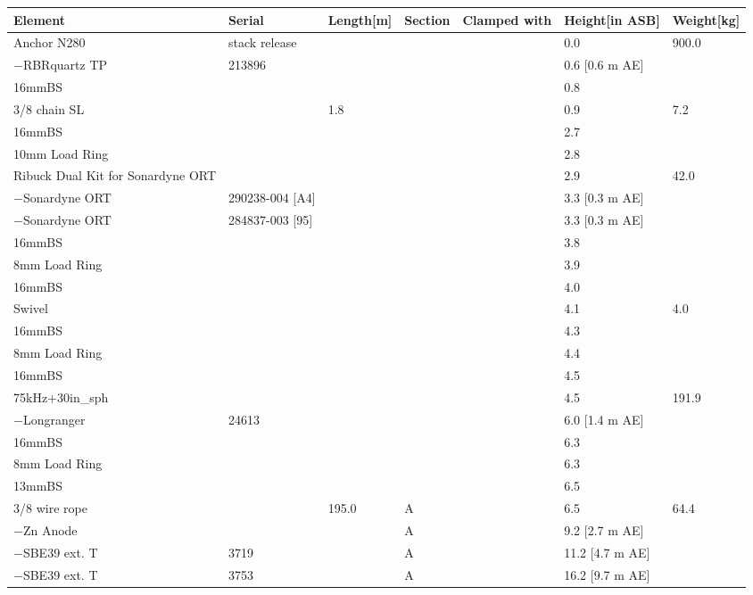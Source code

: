 \documentclass{article}
\begin{document}
\begin{tabularx}{\linewidth}{|X|X|l|l|l|X|l|}
\caption{N280 \textcolor{red}{$\blacksquare$}: Assembly summary}\\
\hline
\textbf{Element} & \textbf{Serial} & \textbf{Length[m]} & \textbf{Section} & \textbf{Clamped with} & \textbf{Height[in ASB]} & \textbf{Weight[kg]} \\
\hline
Anchor N280 & stack release &  &  &  & 0.0 & 900.0 \\ \hline
$-$RBRquartz TP & 213896 &  &  &  & 0.6 [0.6 m AE] &  \\ \hline
16mmBS &  &  &  &  & 0.8 &  \\ \hline
3/8 chain SL &  & 1.8 &  &  & 0.9 & 7.2 \\ \hline
16mmBS &  &  &  &  & 2.7 &  \\ \hline
10mm Load Ring &  &  &  &  & 2.8 &  \\ \hline
Ribuck Dual Kit for Sonardyne ORT &  &  &  &  & 2.9 & 42.0 \\ \hline
$-$Sonardyne ORT & 290238-004 [A4] &  &  &  & 3.3 [0.3 m AE] &  \\ \hline
$-$Sonardyne ORT & 284837-003 [95] &  &  &  & 3.3 [0.3 m AE] &  \\ \hline
16mmBS &  &  &  &  & 3.8 &  \\ \hline
8mm Load Ring &  &  &  &  & 3.9 &  \\ \hline
16mmBS &  &  &  &  & 4.0 &  \\ \hline
Swivel &  &  &  &  & 4.1 & 4.0 \\ \hline
16mmBS &  &  &  &  & 4.3 &  \\ \hline
8mm Load Ring &  &  &  &  & 4.4 &  \\ \hline
16mmBS &  &  &  &  & 4.5 &  \\ \hline
75kHz+30in\_sph &  &  &  &  & 4.5 & 191.9 \\ \hline
$-$Longranger & 24613 &  &  &  & 6.0 [1.4 m AE] &  \\ \hline
16mmBS &  &  &  &  & 6.3 &  \\ \hline
8mm Load Ring &  &  &  &  & 6.3 &  \\ \hline
13mmBS &  &  &  &  & 6.5 &  \\ \hline
3/8 wire rope &  & 195.0 & A &  & 6.5 & 64.4 \\ \hline
$-$Zn Anode &  &  & A &  & 9.2 [2.7 m AE] &  \\ \hline
$-$SBE39 ext. T & 3719 &  & A &  & 11.2 [4.7 m AE] &  \\ \hline
$-$SBE39 ext. T & 3753 &  & A &  & 16.2 [9.7 m AE] &  \\ \hline

\end{tabularx}
\end{document}
